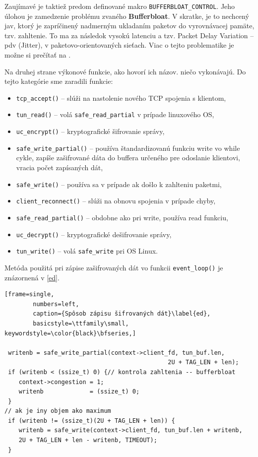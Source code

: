  Zaujímavé je taktiež predom definované makro \lstinline|BUFFERBLOAT_CONTROL|. Jeho úlohou je zamedzenie problému zvaného \textbf{Bufferbloat}. V skratke, je to nechcený jav, ktorý je zapríčinený nadmerným ukladaním paketov do vyrovnávacej pamäte, tzv. zahltenie. To ma za následok vysokú latenciu a tzv. Packet Delay Variation -- \acrshort{pdv} (Jitter), v paketovo-orientovaných sieťach. Viac o tejto problematike je možne si prečítať na \cite{bufferbloat}.
 
 Na druhej strane výkonové funkcie, ako hovorí ich názov. niečo vykonávajú. Do tejto kategórie sme zaradili funkcie:
 \begin{itemize}
 	\item\lstinline|tcp_accept()| -- slúži na nastolenie nového TCP spojenia s klientom, 
 	\item\lstinline|tun_read()| -- volá \lstinline|safe_read_partial| v prípade linuxového OS,
 	\item\lstinline|uc_encrypt()| -- kryptografické šifrovanie správy,
 	\item\lstinline|safe_write_partial()| -- používa štandardizovanú funkciu write vo while cykle, zapíše zašifrované dáta do buffera určeného pre odoslanie klientovi, vracia počet zapísaných dát,
 	\item\lstinline|safe_write()| -- používa sa v prípade ak došlo k zahlteniu paketmi,
 	\item\lstinline|client_reconnect()| -- slúži na obnovu spojenia v prípade chyby,
 	\item\lstinline|safe_read_partial()| -- obdobne ako pri write, používa read funkciu,
 	\item\lstinline|uc_decrypt()| -- kryptografické dešifrovanie správy,
 	\item\lstinline|tun_write()| -- volá \lstinline|safe_write| pri OS Linux.
 \end{itemize}
Metóda použitá pri zápise zašifrovaných dát vo funkcii \lstinline|event_loop()| je znázornená v \ref{ed}.

 \begin{minipage}{\linewidth} 	
 	\begin{lstlisting}[frame=single,
 		numbers=left,
 		caption={Spôsob zápisu šifrovaných dát}\label{ed},
 		basicstyle=\ttfamily\small, keywordstyle=\color{black}\bfseries,]
 		
 writenb = safe_write_partial(context->client_fd, tun_buf.len,
 			    	 		         		  2U + TAG_LEN + len); 
 if (writenb < (ssize_t) 0) {// kontrola zahltenia -- bufferbloat
 	context->congestion = 1; 
 	writenb             = (ssize_t) 0;
 }
// ak je iny objem ako maximum
 if (writenb != (ssize_t)(2U + TAG_LEN + len)) {
 	writenb = safe_write(context->client_fd, tun_buf.len + writenb,
 	2U + TAG_LEN + len - writenb, TIMEOUT); 
 }
   	\end{lstlisting}
\end{minipage}\\ 
 
